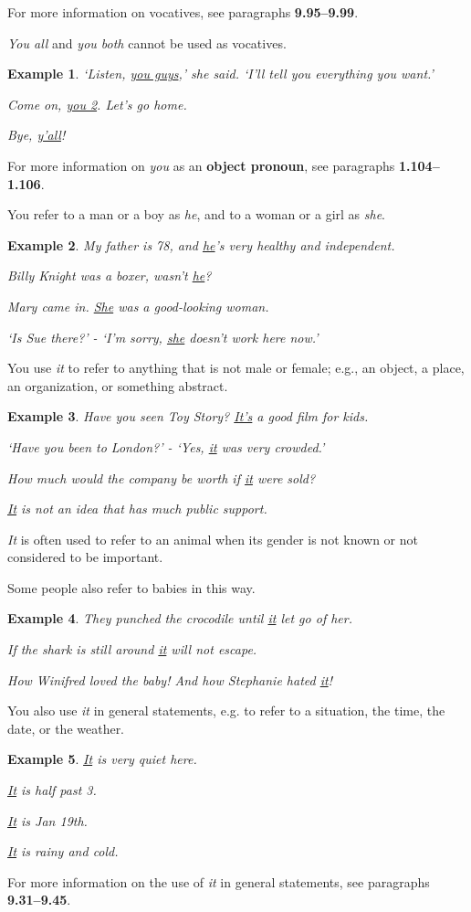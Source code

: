 \documentclass[oneside]{book}
\numberwithin{equation}{section}
\newtheorem{example}{Example}[section]
\begin{document}
For more information on vocatives, see paragraphs \textbf{9.95--9.99}.

\textit{You all} and \textit{you both} cannot be used as vocatives.
\begin{example}
    `Listen, \underline{you guys},' she said. `I'll tell you everything you want.'
    
    Come on, \underline{you 2}. Let's go home.
    
    Bye, \underline{y'all}!
\end{example}
For more information on \textit{you} as an \textbf{object pronoun}, see paragraphs \textbf{1.104--1.106}.

%
\noindent{} You refer to a man or a boy as \textit{he}, and to a woman or a girl as \textit{she}.
\begin{example}
    My father is 78, and \underline{he}'s very healthy and independent.
    
    Billy Knight was a boxer, wasn't \underline{he}?
    
    Mary came in. \underline{She} was a good-looking woman.
    
    `Is Sue there?' - `I'm sorry, \underline{she} doesn't work here now.'
\end{example}
%
\noindent{} You use \textit{it} to refer to anything that is not male or female; e.g., an object, a place, an organization, or something abstract.
\begin{example}
    Have you seen Toy Story? \underline{It's} a good film for kids.
    
    `Have you been to London?' - `Yes, \underline{it} was very crowded.'
    
    How much would the company be worth if \underline{it} were sold?
    
    \underline{It} is not an idea that has much public support.
\end{example}
\textit{It} is often used to refer to an animal when its gender is not known or not considered to be important.

Some people also refer to babies in this way.
\begin{example}
    They punched the crocodile until \underline{it} let go of her.
    
    If the shark is still around \underline{it} will not escape.
    
    How Winifred loved the baby! And how Stephanie hated \underline{it}!
\end{example}
You also use \textit{it} in general statements, e.g. to refer to a situation, the time, the date, or the weather.
\begin{example}
    \underline{It} is very quiet here.
    
    \underline{It} is half past 3.
    
    \underline{It} is Jan 19th.
    
    \underline{It} is rainy and cold.
\end{example}
For more information on the use of \textit{it} in general statements, see paragraphs \textbf{9.31--9.45}.
\end{document}
